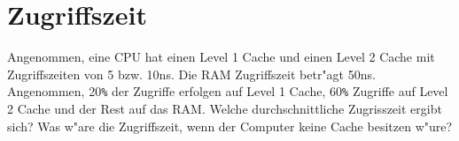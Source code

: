 \documentclass[a4paper,10pt]{article}
\begin{document}
\section{Zugriffszeit}
Angenommen, eine CPU hat einen Level 1 Cache und einen Level 2 Cache mit Zugriffszeiten
von 5 bzw. 10ns. Die RAM Zugriffszeit betr"agt 50ns. Angenommen, 20\verb|%|
der Zugriffe erfolgen auf Level 1 Cache, 60\verb|%| Zugriffe auf Level 2 Cache
und der Rest auf das RAM. Welche durchschnittliche Zugrisszeit ergibt sich?
Was w"are die Zugriffszeit, wenn der Computer keine Cache besitzen w"ure?
\end{document}
